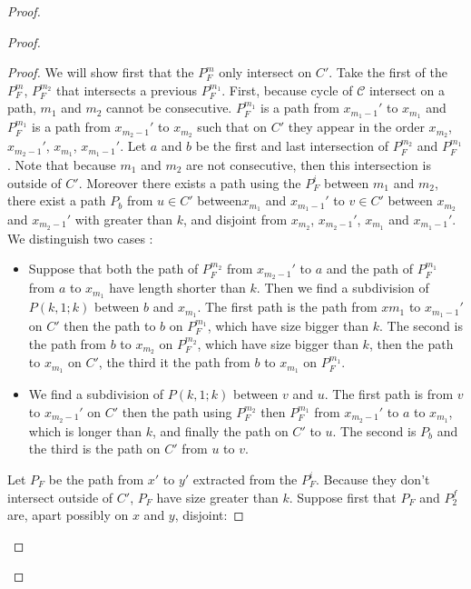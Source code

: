 \documentclass[utf8,10pt]{article}
\theoremstyle{plain}
\theoremstyle{definition}
\theoremstyle{remark}
\begin{document}
\begin{proof}
\begin{proof}
\begin{proof}
We will show first that the $P_F^m$ only intersect on $C'$. Take the first of the $P_F^m$, $P_F^{m_2}$ that intersects
a previous $P_F^{m_1}$. First, because cycle of $\mathcal{C}$ intersect on a path, $m_1$ and $m_2$ cannot be consecutive.
$P_F^{m_1}$ is a path from $x_{m_1-1}'$ to $x_{m_1}$ and  $P_F^{m_1}$ is a path from $x_{m_2-1}'$ to $x_{m_2}$ such that on $C'$ they appear
in the order $x_{m_2}$, $x_{m_2-1}'$, $x_{m_1}$, $x_{m_1-1}'$.
Let $a$ and $b$ be the first and last intersection of $P_F^{m_2}$ and $P_F^{m_1}$.
Note that because $m_1$ and $m_2$ are not consecutive, then this intersection is outside of $C'$.
Moreover there exists a path using the $P_F^i$ between $m_1$ and $m_2$, there exist a path $P_b$ from $u \in C'$
between$x_{m_1}$ and $x_{m_1-1}'$ to $v \in C'$ between $x_{m_2}$ and $x_{m_2-1}'$ with greater than $k$,
and disjoint from $x_{m_2}$, $x_{m_2-1}'$, $x_{m_1}$ and $x_{m_1-1}'$. We distinguish two cases :
\begin{itemize}
	\item Suppose that both the path of $P_F^{m_2}$ from $x_{m_2-1}'$ to $a$ and the path of $P_F^{m_1}$ from $a$ to $x_{m_1}$ have
	length shorter than $k$. Then we find a subdivision of $P(k,1;k)$ between $b$ and $x_{m_1}$. The first path is the path from
	$x{m_1}$ to $x_{m_1-1}'$ on $C'$ then the path to $b$ on $P_F^{m_1}$, which have size bigger than $k$.
	The second is the path from $b$ to $x_{m_2}$ on $P_F^{m_2}$, which have size bigger than $k$,
	then the path to $x_{m_1}$ on $C'$, the third it the path from $b$ to $x_{m_1}$ on $P_F^{m_1}$.
	\item We find a subdivision of $P(k,1;k)$ between $v$ and $u$. The first path is from $v$ to $x_{m_2-1}'$ on $C'$ then the
	path using $P_F^{m_2}$ then  $P_F^{m_1}$ from  $x_{m_2-1}'$ to $a$ to $x_{m_1}$, which is longer than $k$,
	and finally the path on $C'$ to $u$. The second is $P_b$ and the third is the path on $C'$ from $u$ to $v$.
\end{itemize}


Let $P_F$ be the path from $x'$ to $y'$ extracted from the $P_F^i$. Because they don't intersect outside of $C'$,
$P_F$ have size greater than $k$.
Suppose first that $P_F$ and $P_2^f$ are, apart possibly on $x$ and $y$, disjoint:



\end{proof}
\end{proof}
\end{proof}
\end{document}
